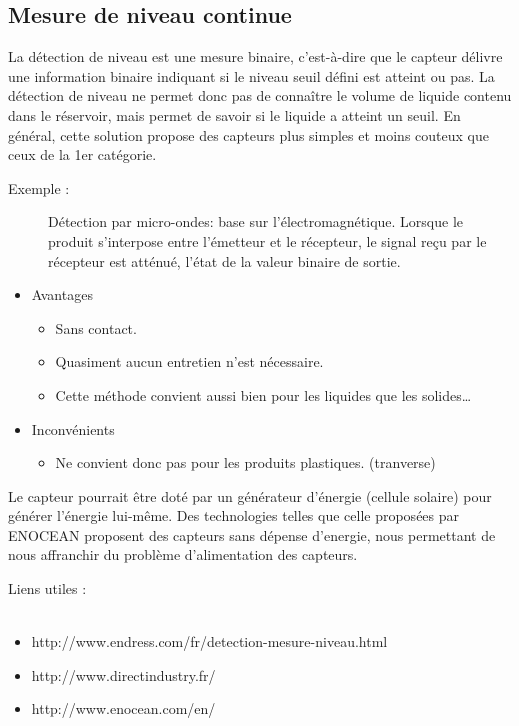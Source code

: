 	\subsection {Mesure de niveau continue}
	La détection de niveau est une mesure binaire, c'est-à-dire que le capteur délivre une information binaire indiquant si le niveau seuil défini est atteint ou 		pas. La détection de niveau ne permet donc pas de connaître le volume de liquide contenu dans le réservoir, mais permet de savoir si le liquide a atteint un 		seuil. En général, cette solution propose des capteurs plus simples et moins couteux que ceux de la 1er catégorie.

	\begin {description}
		\item [Exemple :]
	Détection par micro-ondes: base sur l’électromagnétique. Lorsque le produit s'interpose entre l'émetteur et le récepteur, le signal reçu par le récepteur est atténué,  l'état de la valeur binaire de sortie.
	\end {description}
	\begin {itemize}
		\item Avantages 
		\begin {itemize}
			\item Sans contact. 
			\item Quasiment aucun entretien n'est nécessaire. 
			\item Cette méthode convient aussi bien pour les liquides que les solides…
		\end {itemize}
		\item Inconvénients
		\begin {itemize}
			\item Ne convient donc pas pour les produits plastiques. (tranverse)
		\end {itemize}
	\end {itemize}

Le capteur pourrait être doté par un générateur d'énergie (cellule solaire) pour générer l'énergie lui-même. Des technologies telles que celle proposées par ENOCEAN proposent des capteurs sans dépense d'energie, nous permettant de nous affranchir du problème d'alimentation des capteurs.


Liens utiles : \\~
\begin {itemize}
	\item http://www.endress.com/fr/detection-mesure-niveau.html
	\item http://www.directindustry.fr/
	\item http://www.enocean.com/en/
\end {itemize}

